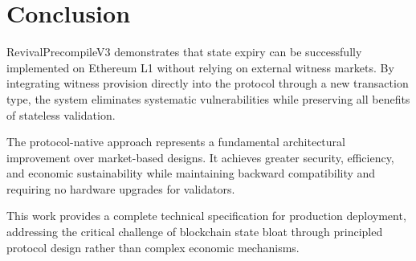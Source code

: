 \documentclass{article}
\begin{document}
\section{Conclusion}

RevivalPrecompileV3 demonstrates that state expiry can be successfully implemented on Ethereum L1 without relying on external witness markets. By integrating witness provision directly into the protocol through a new transaction type, the system eliminates systematic vulnerabilities while preserving all benefits of stateless validation.

The protocol-native approach represents a fundamental architectural improvement over market-based designs. It achieves greater security, efficiency, and economic sustainability while maintaining backward compatibility and requiring no hardware upgrades for validators.

This work provides a complete technical specification for production deployment, addressing the critical challenge of blockchain state bloat through principled protocol design rather than complex economic mechanisms.




\end{document}
